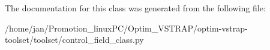 The documentation for this class was generated from the following file\+:\begin{DoxyCompactItemize}
\item 
/home/jan/\+Promotion\+\_\+linux\+P\+C/\+Optim\+\_\+\+V\+S\+T\+R\+A\+P/optim-\/vstrap-\/toolset/toolset/control\+\_\+field\+\_\+class.\+py\end{DoxyCompactItemize}
